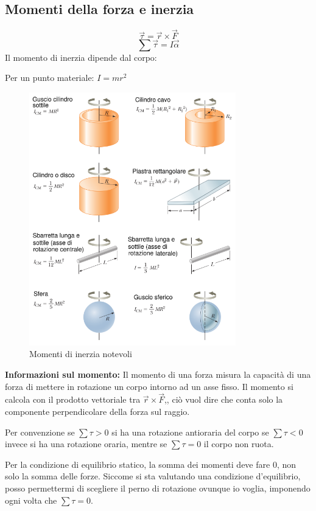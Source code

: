 \documentclass[a4paper]{article}
\theoremstyle{break}
\theoremstyle{break}
\theoremstyle{break}
\theoremstyle{break}
\begin{document}
\subsection{Momenti della forza e inerzia}
\[
  \vec{\tau} = \vec{r} \times \vec{F}
\]
\[
  \sum \vec{\tau} = I \vec{\alpha}
\] 
Il momento di inerzia dipende dal corpo:

\noindent Per un punto materiale: \( I = m r^2 \)
\begin{figure}[H]
  \centering
  \includegraphics[width=0.8\textwidth]{inerzia}
  \caption{Momenti di inerzia notevoli}
  \label{fig:momenti_inerzia}
\end{figure}

\noindent \textbf{Informazioni sul momento: }
\noindent Il momento di una forza misura la capacità di una forza di mettere in rotazione un corpo intorno ad
un asse fisso. Il momento si calcola con il prodotto vettoriale tra \( \vec{r} \times \vec{F} \),,
ciò vuol dire che conta solo la componente perpendicolare della forza sul raggio.

\vspace{1em}
\noindent Per convenzione se \( \sum \tau > 0 \) si ha una rotazione antioraria del corpo
se \( \sum \tau < 0 \) invece si ha una
rotazione oraria, mentre se \( \sum \tau = 0 \) il corpo non ruota.

\vspace{1em}
\noindent Per la condizione di equilibrio statico, la somma dei momenti deve fare 0, non solo la somma delle
forze. Siccome si sta valutando una condizione d’equilibrio, posso permettermi di scegliere il perno
di rotazione ovunque io voglia, imponendo ogni volta che \( \sum \tau = 0 \).
\end{document}
